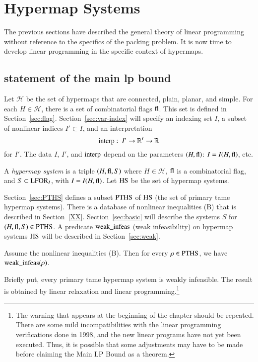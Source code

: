 \section{Hypermap Systems}

The previous sections have described the general theory of linear
programming without reference to the specifics of the packing
problem.  It is now time to develop linear programming in the
specific context of  hypermaps.

\subsection{statement of the main lp bound}

Let $\mathcal H$ be the set of  hypermaps that are connected,
plain, planar, and simple. For each $H\in \mathcal H$, there is a
set of combinatorial flags ${\operatorname{fl}}$.  This set is defined in
Section~\ref{sec:flag}.  Section~\ref{sec:var-index} will specify
an indexing set $I$, a subset of nonlinear indices $I'\subset I$,
and an interpretation
  $${\operatorname{interp}}:\ I'\to \mathbb{R}^I\to\mathbb{R}$$
for $I'$.  The data $I$, $I'$, and ${\operatorname{interp}}$ depend on the
parameters $(H,{\operatorname{fl}})$: $I = I(H,{\operatorname{fl}})$, etc.

\begin{definition}
A {\it hypermap system} is a triple $(H,{\operatorname{fl}},S)$ where
    $H\in {\mathcal H}$,
    ${\operatorname{fl}}$ is a
    combinatorial flag,
    and $S\subset {\operatorname{LFOR}}_I$, with $I = I(H,{\operatorname{fl}})$.
    Let ${\operatorname{HS}}$ be the set of hypermap systems.
\end{definition}

Section~\ref{sec:PTHS} defines a subset ${\operatorname{PTHS}}$ of ${\operatorname{HS}}$
(the set of primary tame hypermap systems).  There is a database
of nonlinear inequalities (B) that is described in
Section~\ref{XX}. Section~\ref{sec:basic} will describe the
systems $S$ for $(H,{\operatorname{fl}},S)\in{\operatorname{PTHS}}$.  A predicate
${\operatorname{weak\_infeas}}$ (weak infeasibility) on hypermap systems
${\operatorname{HS}}$ will be described in Section~\ref{sec:weak}.

\begin{theorem}\label{thm:lpbound} Assume the nonlinear
inequalities (B).  Then for every $\rho\in {\operatorname{PTHS}}$, we have
${\operatorname{weak\_infeas}}(\rho)$.
\end{theorem}

Briefly put, every primary tame hypermap system is weakly
infeasible.  The result is obtained by linear relaxation and
linear programming.\footnote{The warning that appears at the
beginning of the chapter should be repeated.  There are some mild
incompatibilities with the linear programming verifications done
in 1998, and the new linear programs have not yet been executed.
Thus, it is possible that some adjustments may have to be made
before claiming the Main LP Bound as a theorem.}

